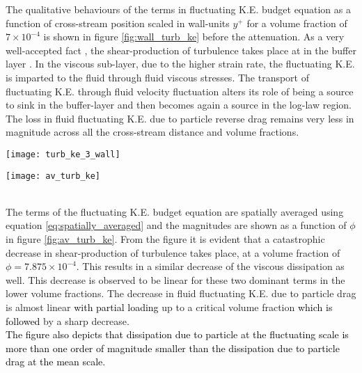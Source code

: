 \documentclass[aip,graphicx]{revtex4-1}
\begin{document}
 The qualitative behaviours of the terms in fluctuating K.E. budget equation as a function of cross-stream position scaled in wall-units $y^+$ for a volume fraction of $7\times10^{-4}$ is shown in figure \ref{fig:wall_turb_ke} before the attenuation. As a very well-accepted fact , the shear-production of turbulence takes place at in the buffer layer \citep{andrade2018analyzing}. In the viscous sub-layer, due to the higher strain rate, the fluctuating K.E. is imparted to the fluid through fluid viscous stresses. The transport of fluctuating K.E. through fluid velocity fluctuation alters its role of being a source to sink in the buffer-layer and then becomes again a source in the log-law region. The loss in fluid fluctuating K.E. due to particle reverse drag remains very less in magnitude across all the cross-stream distance and volume fractions.       
\begin{figure*}[!]
	\texttt{[image: turb\_ke\_3\_wall]}
		\caption{ Terms of fluid phase fluctuating K.E. as a function of cross-stream position in wall-scaling for $\phi=7\times10^{-4}$}
	\label{fig:wall_turb_ke}
\end{figure*}
\begin{figure*}[!h]
	\texttt{[image: av\_turb\_ke]}
		\caption{Magnitude of spatially averaged terms of fluid phase fluctuating K.E. as a function of $\phi$}
	\label{fig:av_turb_ke}
\end{figure*}
\\The terms of the fluctuating K.E. budget equation are spatially averaged using equation \ref{eq:spatially_averaged} and the magnitudes are shown  as a function of $\phi$ in figure \ref{fig:av_turb_ke}. From the figure it is evident that a catastrophic decrease in shear-production of turbulence takes place, at a volume fraction of $\phi=7.875\times10^{-4}$. This results in a similar decrease of the viscous dissipation as well. This decrease is observed to be linear for these two dominant terms in the lower volume fractions. The decrease in fluid fluctuating K.E. due to particle drag is almost linear \textcolor{black}{with partial loading} up to a critical volume fraction \textcolor{black}{which is followed} by a sharp decrease.
\\\textcolor{black}{The figure also depicts that dissipation due to particle at the fluctuating scale is more than one order of magnitude smaller than the dissipation due to particle drag at the mean scale.}	
\clearpage
\end{document}
